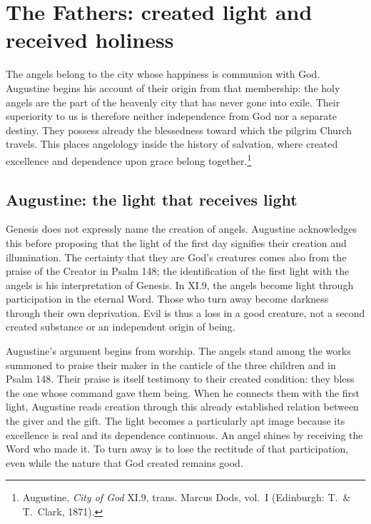 \section{The Fathers: created light and received holiness}
\label{sec:fathers}

The angels belong to the city whose happiness is communion with God. Augustine begins his account of their origin from that membership: the holy angels are the part of the heavenly city that has never gone into exile. Their superiority to us is therefore neither independence from God nor a separate destiny. They possess already the blessedness toward which the pilgrim Church travels. This places angelology inside the history of salvation, where created excellence and dependence upon grace belong together.\footnote{Augustine, \emph{City of God} XI.9, trans. Marcus Dods, vol.~I (Edinburgh: T.~\& T.~Clark, 1871).}

\subsection{Augustine: the light that receives light}

Genesis does not expressly name the creation of angels. Augustine acknowledges this before proposing that the light of the first day signifies their creation and illumination. The certainty that they are God's creatures comes also from the praise of the Creator in Psalm 148; the identification of the first light with the angels is his interpretation of Genesis. In XI.9, the angels become light through participation in the eternal Word. Those who turn away become darkness through their own deprivation. Evil is thus a loss in a good creature, not a second created substance or an independent origin of being.


Augustine's argument begins from worship. The angels stand among the works summoned to praise their maker in the canticle of the three children and in Psalm 148. Their praise is itself testimony to their created condition: they bless the one whose command gave them being. When he connects them with the first light, Augustine reads creation through this already established relation between the giver and the gift. The light becomes a particularly apt image because its excellence is real and its dependence continuous. An angel shines by receiving the Word who made it. To turn away is to lose the rectitude of that participation, even while the nature that God created remains good.

